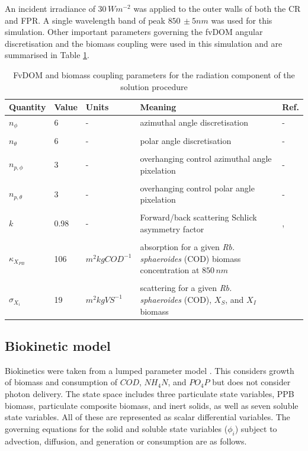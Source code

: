 An incident irradiance of $30\, Wm^{-2}$ was applied to the outer walls of both the CR and FPR. A single wavelength band of peak $850\, \pm 5 nm$ was used for this simulation. Other important parameters governing the fvDOM angular discretisation and the biomass coupling were used in this simulation and are summarised in Table \ref{tab:photoBioProperties}.

\begin{table}[tp]
\caption{FvDOM and biomass coupling parameters for the radiation component of the solution procedure}
\centering
\label{tab:photoBioProperties}
\begin{tabular}{p{2.5cm} p{1.2cm}  p{2.3cm} p{4.5cm} p{1.3cm}}

\hline
\textbf{Quantity} & \textbf{Value} & \textbf{Units} & \textbf{Meaning} & \textbf{Ref.}\\ \hline
$n_\phi$ & 6 & - &azimuthal angle discretisation & - \\ \\
$n_\theta$ & 6 & - & polar angle discretisation & - \\ \\
$n_{p,\phi}$& 3 & - & overhanging control azimuthal angle pixelation & - \\ \\
$n_{p,\theta}$& 3 & - & overhanging control polar angle pixelation & -\\ \\
$k$ & 0.98 & - & Forward/back scattering Schlick asymmetry factor & \cite{jarosz2008}, \cite{berberoglu2007a}\\ \\ 
$\kappa_{X_{PB}}$ & 106 & $m^2 kgCOD^{-1}$ & absorption for a given \textit{Rb. sphaeroides} (COD) biomass concentration at $850\, nm$ & \cite{berberoglu2007a}\\ \\
$\sigma_{X_{i}}$ & 19 & $m^2 kgVS^{-1}$ & scattering for a given \textit{Rb. sphaeroides} (COD), $X_S$, and $X_I$ biomass & \cite{berberoglu2007a}\\
\hline
\end{tabular}
\end{table}
\newpage
\subsection{Biokinetic model}
Biokinetics were taken from a lumped parameter model \cite{puyol2017}. This considers growth of biomass and consumption of $COD$, $NH_4N$, and $PO_4P$ but does not consider photon delivery. The state space includes three particulate state variables, PPB biomass, particulate composite biomass, and inert solids, as well as seven soluble state variables. All of these are represented as scalar differential variables. The governing equations for the solid and soluble state variables ($\phi_i$) subject to advection, diffusion, and generation or consumption are as follows.

